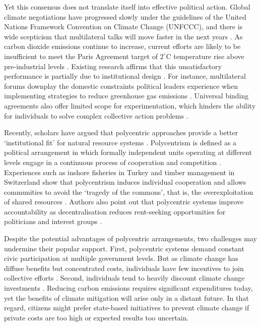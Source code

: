 \documentclass[a4paper,12pt]{article}
\begin{document}
Yet this consensus does not translate itself into effective political action. Global climate negotiations have progressed slowly under the guidelines of the United Nations Framework Convention on Climate Change (UNFCCC), and there is wide scepticism that multilateral talks will move faster in the next years \citep{cole2015advantages, hjerpe2015views}. As carbon dioxide emissions continue to increase, current efforts are likely to be insufficient to meet the Paris Agreement target of $2^{\circ}$C temperature rise above pre-industrial levels \citep{jordan2015emergence}. Existing research affirms that this unsatisfactory performance is partially due to institutional design \citep{ostrom2014polycentric, cole2015advantages}. For instance, multilateral forums downplay the domestic constraints political leaders experience when implementing strategies to reduce greenhouse gas emissions \citep{rayner2010eat}. Universal binding agreements also offer limited scope for experimentation, which hinders the ability for individuals to solve complex collective action problems \citep{de2014global}.

Recently, scholars have argued that polycentric approaches provide a better `institutional fit' for natural resource systems \citep{turnheim2018innovating,berkhout2003negotiating, carlisle2017polycentric, ostrom1990governing}. Polycentrism is defined as a political arrangement in which formally independent units operating at different levels engage in a continuous process of cooperation and competition \citep{cole2015advantages,aligica2013co}. Experiences such as inshore fisheries in Turkey and timber management in Switzerland show that polycentrism induces individual cooperation and allows communities to avoid the `tragedy of the commons', that is, the overexploitation of shared resources \citep{hardin1968tragedy, ostrom1990governing}. Authors also point out that polycentric systems improve accountability as decentralisation reduces rent-seeking opportunities for politicians and interest groups \citep{turnheim2018innovating,ostrom2012nested,ostrom2014polycentric,sovacool2013adaptation}. 

Despite the potential advantages of polycentric arrangements, two challenges may undermine their popular support. First, polycentric systems demand constant civic participation at multiple government levels. But as climate change has diffuse benefits but concentrated costs, individuals have few incentives to join collective efforts \citep{barrett2003increasing, heitzig2011self, nordhaus2015climate}. Second, individuals tend to heavily discount climate change investments \citep{dasgupta2008discounting, nordhaus1997discounting}. Reducing carbon emissions requires significant expenditures today, yet the benefits of climate mitigation will arise only in a distant future. In that regard, citizens might prefer state-based initiatives to prevent climate change if private costs are too high or expected results too uncertain. 
\end{document}

